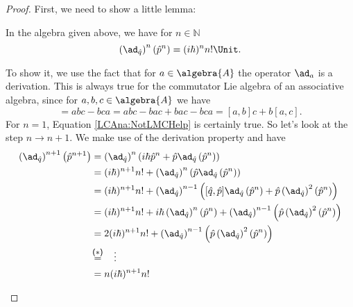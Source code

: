 \begin{proof}
	First, we need to show a little lemma:
	\begin{lemma}
		\label{Lemma:LCAna:NotLMCHelp}
		In the algebra given above, we have for $n \in \mathbb{N}$
		\begin{equation}
			\label{LCAna:NotLMCHelp}
			\left( \ad_{\hat{q}} \right)^n (\hat{p}^n)
			=
			(i \hbar)^n n! \Unit.
		\end{equation}
	\end{lemma}
	\begin{subproof}
		To show it, we use the fact that for $a \in \algebra{A}$ the 
		operator $\ad_a$ is a derivation. This is always true for the 
		commutator Lie algebra of an associative algebra, since for 
		$a, b, c \in \algebra{A}$ we have
		\begin{equation*}
			[a, bc]
			=
			a b c - b c a
			=
			a b c - b a c + b a c - b c a
			=
			[a, b] c + b [a, c].
		\end{equation*}
		For $n = 1$, Equation \eqref{LCAna:NotLMCHelp} is 
		certainly true. So let's look at the step $n \rightarrow n+1$.
		We make use of the derivation property and have
		\begin{align*}
			\left( \ad_{\hat{q}} \right)^{n+1}
			\left( \hat{p}^{n+1} \right)
			& =
			\left( \ad_{\hat{q}} \right)^{n}
			\left(
				i \hbar \hat{p}^n
				+
				\hat{p} 
				\ad_{\hat{q}} \left( \hat{p}^n \right)
			\right)
			\\
			& =
			(i \hbar)^{n + 1} n!
			+
			\left( \ad_{\hat{q}} \right)^{n}
			\left(
				\hat{p}
				\ad_{\hat{q}} \left( \hat{p}^n \right)
			\right)
			\\
			& =
			(i \hbar)^{n + 1} n!
			+
			\left( \ad_{\hat{q}} \right)^{n-1}
			\left(
				[\hat{q}, \hat{p}]
				\ad_{\hat{q}} \left( \hat{p}^n \right)
				+
				\hat{p}
				\left( \ad_{\hat{q}} \right)^2
				\left( \hat{p}^n \right)
			\right)
			\\
			& =
			(i \hbar)^{n + 1} n!
			+
			i \hbar
			\left( \ad_{\hat{q}} \right)^{n}
			\left( \hat{p}^n \right)
			+
			\left( \ad_{\hat{q}} \right)^{n-1}
			\left(
				\hat{p}
				\left( \ad_{\hat{q}} \right)^2
				\left( \hat{p}^n \right)
			\right)
			\\
			& =
			2 (i \hbar)^{n+1} n!
			+
			\left( \ad_{\hat{q}} \right)^{n-1}
			\left(
				\hat{p}
				\left( \ad_{\hat{q}} \right)^2
				\left( \hat{p}^n \right)
			\right)
			\\
			& \ot{($*$)}{=} 
			\quad \vdots
			\\
			& =
			n (i \hbar)^{n+1} n!

\end{align*}
\end{subproof}
\end{proof}
